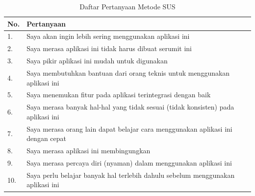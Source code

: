 \begin{table}[H]
\centering
\caption{Daftar Pertanyaan Metode SUS \citep{kortum2015measuring}}
\label{item_pernyataan_system_usability_scale}
\begin{tabular}{|l| >{\centering\arraybackslash} m{12cm}|} 
\hline
\textbf{No.} & \textbf{Pertanyaan}  \\ 
\hline
1.           &  Saya akan ingin lebih sering menggunakan aplikasi ini   \\ 
\hline
2.           & Saya merasa aplikasi ini tidak harus dibuat serumit ini  \\ 
\hline
3.           & Saya pikir aplikasi ini mudah untuk digunakan  \\ 
\hline
4.           & Saya membutuhkan bantuan dari orang teknis untuk menggunakan aplikasi ini    \\ 
\hline
5.           & Saya menemukan fitur pada aplikasi terintegrasi dengan baik   \\
\hline
6.           & Saya merasa banyak hal-hal yang tidak sesuai (tidak konsisten) pada aplikasi ini   \\
\hline
7.           & Saya merasa orang lain dapat belajar cara menggunakan aplikasi ini dengan cepat   \\
\hline
8.           & Saya merasa aplikasi ini membingungkan   \\
\hline
9.           & Saya merasa percaya diri (nyaman) dalam menggunakan aplikasi ini   \\
\hline
10.           & Saya perlu belajar banyak hal terlebih dahulu sebelum menggunakan aplikasi ini   \\
\hline
\end{tabular}
\end{table}



\fancyhf{} 
\fancyfoot[R]{\thepage}

